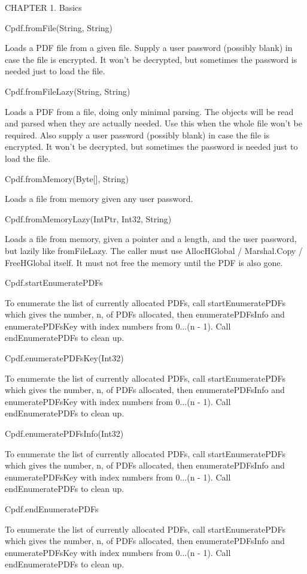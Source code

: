 CHAPTER 1. Basics

Cpdf.fromFile(String, String)


Loads a PDF file from a given file. Supply
a user password (possibly blank) in case the file is encrypted. It won't be
decrypted, but sometimes the password is needed just to load the file.


Cpdf.fromFileLazy(String, String)


Loads a PDF from a file, doing only minimal
parsing. The objects will be read and parsed when they are actually
needed. Use this when the whole file won't be required. Also supply a user
password (possibly blank) in case the file is encrypted. It won't be
decrypted, but sometimes the password is needed just to load the file.


Cpdf.fromMemory(Byte[], String)


Loads a file from memory given any user password.


Cpdf.fromMemoryLazy(IntPtr, Int32, String)


Loads a file from memory, given a
pointer and a length, and the user password, but lazily like
fromFileLazy. The caller must use AllocHGlobal / Marshal.Copy / FreeHGlobal
itself. It must not free the memory until the PDF is also gone.


Cpdf.startEnumeratePDFs


To enumerate the list of currently allocated PDFs, call
startEnumeratePDFs which gives the number, n, of PDFs allocated, then
enumeratePDFsInfo and enumeratePDFsKey with index numbers from
0...(n - 1). Call endEnumeratePDFs to clean up.


Cpdf.enumeratePDFsKey(Int32)


To enumerate the list of currently allocated PDFs, call
startEnumeratePDFs which gives the number, n, of PDFs allocated, then
enumeratePDFsInfo and enumeratePDFsKey with index numbers from
0...(n - 1). Call endEnumeratePDFs to clean up.


Cpdf.enumeratePDFsInfo(Int32)


To enumerate the list of currently allocated PDFs, call
startEnumeratePDFs which gives the number, n, of PDFs allocated, then
enumeratePDFsInfo and enumeratePDFsKey with index numbers from
0...(n - 1). Call endEnumeratePDFs to clean up.


Cpdf.endEnumeratePDFs


To enumerate the list of currently allocated PDFs, call
startEnumeratePDFs which gives the number, n, of PDFs allocated, then
enumeratePDFsInfo and enumeratePDFsKey with index numbers from
0...(n - 1). Call endEnumeratePDFs to clean up.


